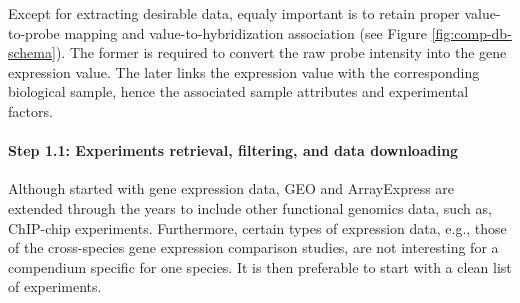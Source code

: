 %
%
%
Except for extracting desirable data, equaly important is to retain proper
value-to-probe mapping and value-to-hybridization association (see
Figure \ref{fig:comp-db-schema}).
%
The former is required to convert the raw probe intensity into the gene
expression value.
%
The later links the expression value with the corresponding biological sample,
hence the associated sample attributes and experimental factors.




\paragraph{Step 1.1: Experiments retrieval, filtering, and data downloading}

Although started with gene expression data, GEO and ArrayExpress are
extended through the years to include other functional genomics data,
such as, ChIP-chip experiments.
%
Furthermore, certain types of expression data, e.g., those of the
cross-species gene expression comparison studies, are not interesting
for a compendium specific for one species.
%
It is then preferable to start with a clean list of experiments.





